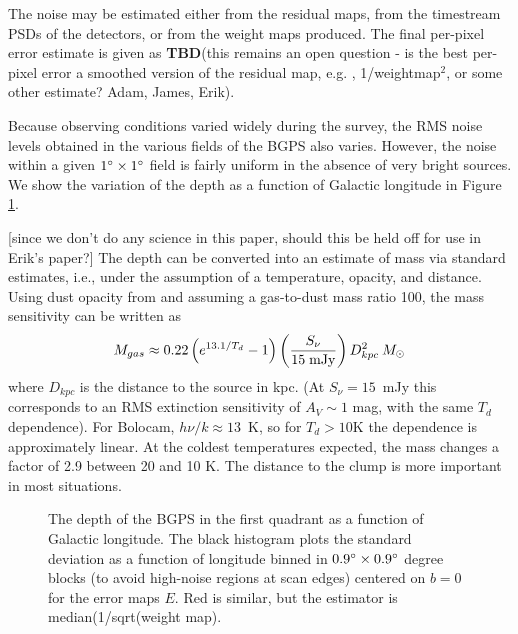 \documentclass[12pt,preprint]{aastex}
\def\msol{\ifmmode {\>M_\odot}\else {$M_\odot$}\fi}
\newcommand{\TBD}{{\bf TBD}}
\def\Figure#1#2#3#4{
\begin{figure}[htb]
\epsscale{#4}
\plotone{#1}
\caption{#2}
\label{#3}
\end{figure}
}
\begin{document}


The noise may be estimated either from the residual maps, from the timestream
PSDs of the detectors, or from the weight maps produced. The final per-pixel
error estimate is given as \TBD (this remains an open question - is the best
per-pixel error a smoothed version of the residual map, e.g.  \citet{enoch06},
1/weightmap$^2$, or some other estimate? Adam, James, Erik).

Because observing conditions varied widely during the survey, the RMS
noise levels obtained in the various fields of the BGPS also varies.
However, the noise within a given $1\mbox{$^\circ$} \times 1\mbox{$^\circ$}$ field is
fairly uniform in the absence of very bright sources.  We show the
variation of the depth as a function of Galactic longitude in Figure
\ref{fig:NoiseVsLongitude}.  

[since we don't do any science in this paper, should this be held off for
use in Erik's paper?]
The depth can be converted into an
estimate of mass via standard estimates, i.e., under the assumption of
a temperature, opacity, and distance.
Using dust opacity from \citet{ossenkopf94}
and assuming a gas-to-dust mass ratio 100, the mass sensitivity
can be written as
\begin{equation} 
\label{eq:Mass}
M_{gas}\approx
0.22\left( e^{13.1/T_d}-1 \right) \left({S_\nu\over 15\; {\rm mJy}} \right)
D^{2}_{kpc} \msol 
\end{equation}
where $D_{kpc}$ is the distance to the source in kpc.  (At $S_\nu =
15$~mJy this corresponds to an RMS extinction sensitivity of $A_V\sim
1$ mag, with the same $T_d$ dependence).  For Bolocam, $h\nu/k \approx
13$~K, so for $T_d > 10$K the dependence is approximately linear.  At
the coldest temperatures expected, the mass changes a factor of 2.9
between 20 and 10 K.  The distance to the clump is more important in most
situations.

\Figure{survey_depth}{The depth of the BGPS in the first quadrant as a
function of Galactic longitude.  The black histogram plots the standard deviation as a 
function of longitude binned in $0.9\mbox{$^\circ$} \times 0.9\mbox{$^\circ$}$ degree blocks
(to avoid high-noise regions at scan edges) centered on $b=0$ for the error
maps $E$.  Red is similar, but the estimator is median(1/sqrt(weight
map).}{fig:NoiseVsLongitude}{1.0}
\end{document}
